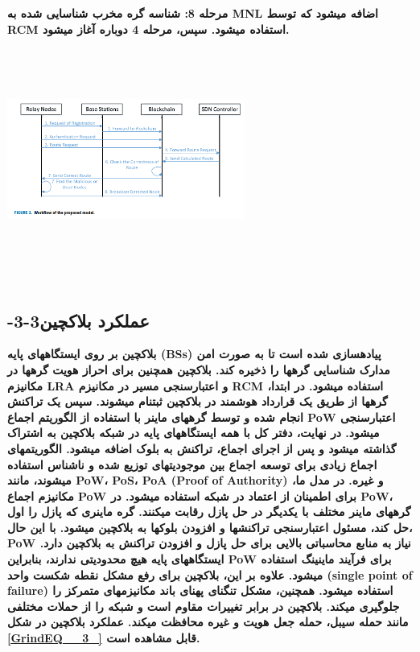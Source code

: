 \documentclass{article} %
\begin{document}
{\bf  مرحله 8: شناسه گره مخرب شناسایی شده به MNL اضافه میشود که توسط RCM استفاده میشود. سپس، مرحله 4 دوباره آغاز میشود. \includegraphics*[width=3.07in, height=3.16in]{image5}}

\noindent 
\subsection{ -3-3عملکرد بلاکچین}

\noindent 
{\bf بلاکچین بر روی ایستگاههای پایه (BSs) پیادهسازی شده است تا به صورت امن مدارک شناسایی گرهها را ذخیره کند. بلاکچین همچنین برای احراز هویت گرهها در مکانیزم LRA و اعتبارسنجی مسیر در مکانیزم RCM استفاده میشود. در ابتدا، گرهها از طریق یک قرارداد هوشمند در بلاکچین ثبتنام میشوند. سپس یک تراکنش انجام شده و توسط گرههای ماینر با استفاده از الگوریتم اجماع PoW اعتبارسنجی میشود. در نهایت، دفتر کل با همه ایستگاههای پایه در شبکه بلاکچین به اشتراک گذاشته میشود و پس از اجرای اجماع، تراکنش به بلوک اضافه میشود. الگوریتمهای اجماع زیادی برای توسعه اجماع بین موجودیتهای توزیع شده و ناشناس استفاده میشوند، مانند PoW، PoS، PoA (Proof of Authority) و غیره. در مدل ما، مکانیزم اجماع PoW برای اطمینان از اعتماد در شبکه استفاده میشود. در PoW، گرههای ماینر مختلف با یکدیگر در حل پازل رقابت میکنند. گره ماینری که پازل را اول حل کند، مسئول اعتبارسنجی تراکنشها و افزودن بلوکها به بلاکچین میشود. با این حال، PoW نیاز به منابع محاسباتی بالایی برای حل پازل و افزودن تراکنش به بلاکچین دارد. ایستگاههای پایه هیچ محدودیتی ندارند، بنابراین PoW برای فرآیند ماینینگ استفاده میشود. علاوه بر این، بلاکچین برای رفع مشکل نقطه شکست واحد (single point of failure) استفاده میشود. همچنین، مشکل تنگنای پهنای باند مکانیزمهای متمرکز را جلوگیری میکند. بلاکچین در برابر تغییرات مقاوم است و شبکه را از حملات مختلفی مانند حمله سیبل، حمله جعل هویت و غیره محافظت میکند. عملکرد بلاکچین در شکل \eqref{GrindEQ__3_} قابل مشاهده است.}
\end{document}
